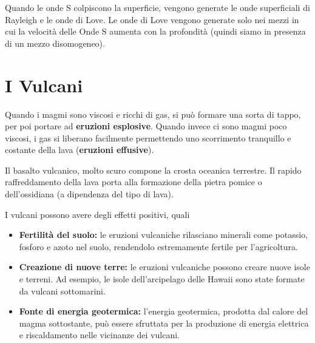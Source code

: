 \documentclass[a4paper]{article}
\begin{document}
Quando le onde S colpiscono la superficie, vengono generate
le onde superficiali di Rayleigh e le onde di Love. Le onde di Love
vengono generate solo nei mezzi in cui la velocità delle
Onde S aumenta con la profondità (quindi siamo in presenza di un mezzo disomogeneo).

\pagebreak

\section{I Vulcani}


Quando i magmi sono viscosi e ricchi di gas, si può formare una sorta di tappo,
per poi portare ad \textbf{eruzioni esplosive}.
Quando invece ci sono magmi poco viscosi, i gas si liberano facilmente
permettendo uno scorrimento tranquillo e costante della lava (\textbf{eruzioni effusive}).


Il basalto vulcanico, molto scuro compone la crosta oceanica terrestre.
Il rapido raffreddamento della lava porta alla formazione della pietra pomice o dell'ossidiana
(a dipendenza del tipo di lava).

I vulcani possono avere degli effetti positivi, quali
\begin{itemize}
    \item \textbf{Fertilità del suolo:} le eruzioni vulcaniche rilasciano minerali come potassio,
        fosforo e azoto nel suolo, rendendolo estremamente fertile per l'agricoltura.
    \item \textbf{Creazione di nuove terre:} le eruzioni vulcaniche possono creare nuove isole
        e terreni. Ad esempio, le isole dell'arcipelago delle Hawaii sono state formate
        da vulcani sottomarini.
    \item \textbf{Fonte di energia geotermica:} l'energia geotermica, prodotta dal calore
        del magma sottostante, può essere sfruttata per la produzione
        di energia elettrica e riscaldamento nelle vicinanze dei vulcani.
\end{itemize}
\end{document}
